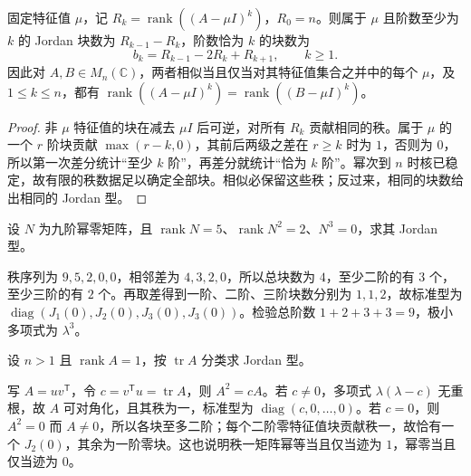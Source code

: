 \begin{theorem}
\label{thm:xie-ex-sim-rank-sequence}
固定特征值 $\mu$，记 $R_k=\operatorname{rank}((A-\mu I)^k)$，$R_0=n$。则属于 $\mu$ 且阶数至少为 $k$ 的 Jordan 块数为 $R_{k-1}-R_k$，阶数恰为 $k$ 的块数为
\begin{equation}
 b_k=R_{k-1}-2R_k+R_{k+1},\qquad k\geq1.
 \label{eq:xie-ex-sim-block-count}
\end{equation}
因此对 $A,B\in M_n(\mathbb C)$，两者相似当且仅当对其特征值集合之并中的每个 $\mu$，及 $1\leq k\leq n$，都有 $\operatorname{rank}((A-\mu I)^k)=\operatorname{rank}((B-\mu I)^k)$。
\end{theorem}
\begin{proof}
非 $\mu$ 特征值的块在减去 $\mu I$ 后可逆，对所有 $R_k$ 贡献相同的秩。属于 $\mu$ 的一个 $r$ 阶块贡献 $\max(r-k,0)$，其前后两级之差在 $r\geq k$ 时为 $1$，否则为 $0$，所以第一次差分统计“至少 $k$ 阶”，再差分就统计“恰为 $k$ 阶”。幂次到 $n$ 时核已稳定，故有限的秩数据足以确定全部块。相似必保留这些秩；反过来，相同的块数给出相同的 Jordan 型。
\end{proof}

\begin{example}
设 $N$ 为九阶幂零矩阵，且 $\operatorname{rank}N=5$、$\operatorname{rank}N^2=2$、$N^3=0$，求其 Jordan 型。
\end{example}
\begin{solve}
秩序列为 $9,5,2,0,0$，相邻差为 $4,3,2,0$，所以总块数为 $4$，至少二阶的有 $3$ 个，至少三阶的有 $2$ 个。再取差得到一阶、二阶、三阶块数分别为 $1,1,2$，故标准型为 $\operatorname{diag}(J_1(0),J_2(0),J_3(0),J_3(0))$。检验总阶数 $1+2+3+3=9$，极小多项式为 $\lambda^3$。
\end{solve}

\begin{example}
\label{ex:xie-ex-sim-rank-one}
设 $n>1$ 且 $\operatorname{rank}A=1$，按 $\operatorname{tr}A$ 分类求 Jordan 型。
\end{example}
\begin{solve}
写 $A=uv^{\mathsf T}$，令 $c=v^{\mathsf T}u=\operatorname{tr}A$，则 $A^2=cA$。若 $c\ne0$，多项式 $\lambda(\lambda-c)$ 无重根，故 $A$ 可对角化，且其秩为一，标准型为 $\operatorname{diag}(c,0,\ldots,0)$。若 $c=0$，则 $A^2=0$ 而 $A\ne0$，所以各块至多二阶；每个二阶零特征值块贡献秩一，故恰有一个 $J_2(0)$，其余为一阶零块。这也说明秩一矩阵幂等当且仅当迹为 $1$，幂零当且仅当迹为 $0$。
\end{solve}


